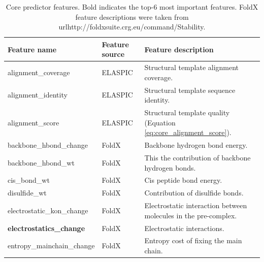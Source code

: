 \begin{table}[tb]
	\centering
	\caption[Core predictor features.]{Core predictor features. Bold indicates the top-6 most important features. FoldX feature descriptions were taken from url{http://foldxsuite.crg.eu/command/Stability}.}
	\label{tab:core_features}
	\begin{tabular}{ l | l | p{7cm} }
		\toprule
		Feature name                              & Feature source & Feature description                                                                                 \\
		\midrule
		alignment\_coverage                       & ELASPIC        & Structural template alignment coverage.                                                             \\
		alignment\_identity                       & ELASPIC        & Structural template sequence identity.                                                              \\
		alignment\_score                          & ELASPIC        & Structural template quality (Equation \ref{eq:core_alignment_score}).                               \\
		backbone\_hbond\_change                   & FoldX          & Backbone hydrogen bond energy.                                                                      \\
		backbone\_hbond\_wt                       & FoldX          & This the contribution of backbone hydrogen bonds.                                                   \\
		cis\_bond\_wt                             & FoldX          & Cis peptide bond energy.                                                                            \\
		disulfide\_wt                             & FoldX          & Contribution of disulfide bonds.                                                                    \\
		electrostatic\_kon\_change                & FoldX          & Electrostatic interaction between molecules in the pre-complex.                                     \\
		\textbf{electrostatics\_change}           & FoldX          & Electrostatic interactions.                                                                         \\
		entropy\_mainchain\_change                & FoldX          & Entropy cost of fixing the main chain.                                                              \\

\end{tabular}
\end{table}
